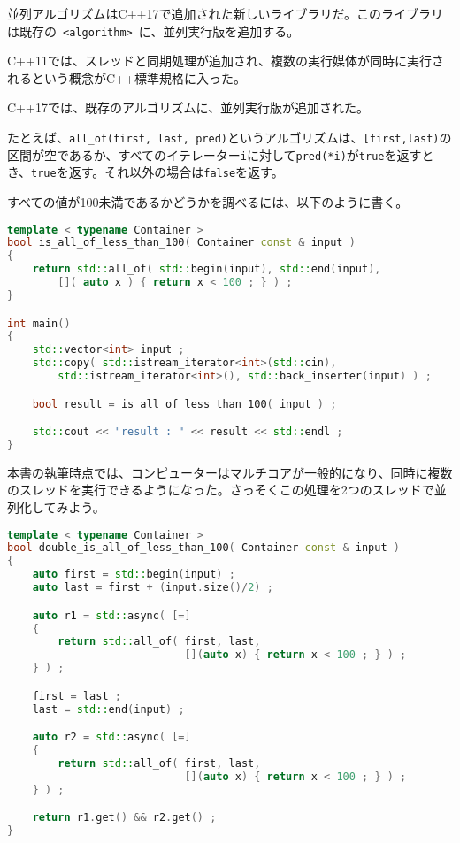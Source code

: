 %

並列アルゴリズムはC++17で追加された新しいライブラリだ。このライブラリは既存の~\lstinline!<algorithm>!~に、並列実行版を追加する。

%

C++11では、スレッドと同期処理が追加され、複数の実行媒体が同時に実行されるという概念がC++標準規格に入った。

C++17では、既存のアルゴリズムに、並列実行版が追加された。

たとえば、\lstinline!all_of(first, last, pred)!というアルゴリズムは、\lstinline![first,last)!の区間が空であるか、すべてのイテレーター\lstinline!i!に対して\lstinline!pred(*i)!が\lstinline!true!を返すとき、\lstinline!true!を返す。それ以外の場合は\lstinline!false!を返す。

すべての値が100未満であるかどうかを調べるには、以下のように書く。

\begin{lstlisting}[language=C++]
template < typename Container >
bool is_all_of_less_than_100( Container const & input )
{
    return std::all_of( std::begin(input), std::end(input),
        []( auto x ) { return x < 100 ; } ) ;
}

int main()
{
    std::vector<int> input ;
    std::copy( std::istream_iterator<int>(std::cin),
        std::istream_iterator<int>(), std::back_inserter(input) ) ;

    bool result = is_all_of_less_than_100( input ) ;

    std::cout << "result : " << result << std::endl ;
}
\end{lstlisting}

本書の執筆時点では、コンピューターはマルチコアが一般的になり、同時に複数のスレッドを実行できるようになった。さっそくこの処理を2つのスレッドで並列化してみよう。

\begin{lstlisting}[language=C++]
template < typename Container >
bool double_is_all_of_less_than_100( Container const & input )
{
    auto first = std::begin(input) ;
    auto last = first + (input.size()/2) ;

    auto r1 = std::async( [=]
    {
        return std::all_of( first, last,
                            [](auto x) { return x < 100 ; } ) ; 
    } ) ;

    first = last ;
    last = std::end(input) ;

    auto r2 = std::async( [=]
    {
        return std::all_of( first, last,
                            [](auto x) { return x < 100 ; } ) ;
    } ) ;

    return r1.get() && r2.get() ;
}
\end{lstlisting}

